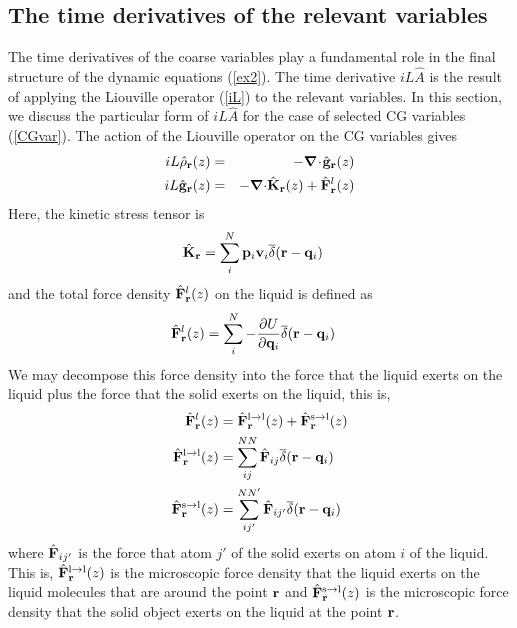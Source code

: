 \documentclass[b5paper,openright,11pt]{book}
\newcommand{\esc}{\!\cdot\!}
\begin{document}
\subsection{The time derivatives of the relevant variables}
The time derivatives  of the coarse variables play  a fundamental role
in the final structure of  the dynamic equations (\ref{ex2}). The time
derivative $  iL\hat{A}$ is  the result of  applying the  Liouville operator
(\ref{iL}) to the relevant variables.  In this section, we discuss the
particular  form of  $  iL\hat{A}$ for  the case  of  selected CG  variables
(\ref{CGvar}). The action of the Liouville operator on the CG variables gives \cite{Espanol2015a}
\begin{eqnarray}
  iL \hat{\rho}_{\bf r}(z) &=& -\boldsymbol{\nabla}\esc\hat{\bf g}_{\bf r}(z)
\nonumber\\
iL  \hat{\bf g}_{\bf r}(z) &=& -\boldsymbol{\nabla}{\cdot} \hat{{\bf K}}_{\bf r}(z)+
\hat{\bf F}^l_{\bf r}(z)
\label{ildens}
\end{eqnarray}
Here, the kinetic stress tensor is 
\begin{align}
  \hat{{\bf K}}_{\bf r} &=\sum^{N}_i{\bf p}_i{\bf v}_i
\overline{\delta}({\bf r}-{\bf q}_i)
\end{align}
and the total  force density $\hat{\bf F}^l_{\bf r}(z)$  on the liquid
is defined as
\begin{align}
  \hat{\bf F}^l_{\bf r}(z) &
=\sum_i^N-\frac{\partial U}{\partial {\bf q}_i}\overline{\delta}({\bf r}-{\bf q}_i)
\label{Frtot}
\end{align}
We may decompose  this force density into the
force that  the liquid exerts on  the liquid plus the  force that the
solid   exerts  on  the   liquid,  this   is,  
\begin{align}
   \hat{\bf  F}^l_{\bf
  r}(z)&=\hat{\bf  F}^{\rm l\to  l}_{\bf r}(z)  +\hat{\bf  F}^{\rm s\to
  l}_{\bf r}(z) 
\nonumber\\
\hat{\bf F}^{\rm l\to l}_{\bf r}(z) &= \sum^{NN}_{ij}\hat{\bf F}_{ij}\overline{\delta}({\bf r}-{\bf q}_i)
\nonumber\\
\hat{\bf F}^{\rm s\to l}_{\bf r}(z) &= \sum^{NN'}_{ij'}\hat{\bf F}_{ij'}\overline{\delta}({\bf r}-{\bf q}_i)
\label{Fr}
\end{align}
where $\hat{\bf F}_{ij'}$ is the force  that atom $j'$ of the solid
exerts on  atom $i$ of  the liquid.   This is, $\hat{\bf  F}^{\rm l\to
  l}_{\bf r}(z)  $ is  the microscopic force  density that  the liquid
exerts on the liquid molecules that are around the point ${\bf r}$ and
$\hat{\bf F}^{\rm s\to l}_{\bf r}(z)$ is the microscopic force density
that the solid object exerts on the liquid at the point ${\bf r}$.
\end{document}
